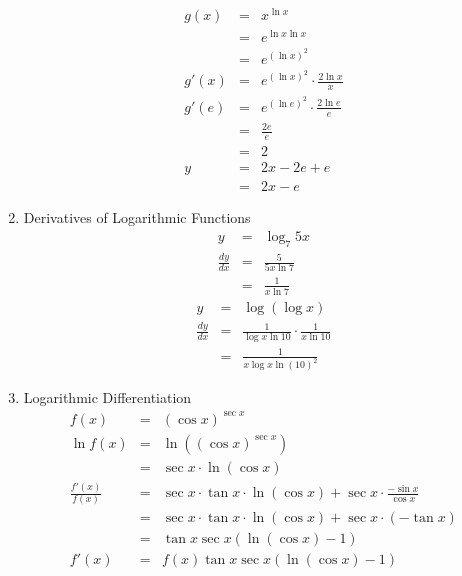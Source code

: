 \documentclass{article}
\begin{document}
\begin{enumerate}
    \begin{eqnarray}
        g(x) &=& x^{\ln{x}} \\
             &=& e^{\ln{x}\ln{x}} \\
             &=& e^{\left(\ln{x}\right)^2} \\
        g'(x) &=& e^{\left(\ln{x}\right)^2} \cdot \frac{2\ln{x}}{x} \\
        g'(e) &=& e^{\left(\ln{e}\right)^2} \cdot \frac{2\ln{e}}{e} \\
              &=& \frac{2e}{e} \\
              &=& 2 \\
        y &=& 2x - 2e + e \\
          &=& 2x - e
    \end{eqnarray}
    \item Derivatives of Logarithmic Functions
    \begin{eqnarray}
        y &=& \log_7{5x} \\
        \frac{dy}{dx} &=& \frac{5}{5x\ln{7}} \\
                      &=& \frac{1}{x\ln{7}}
    \end{eqnarray}
    \begin{eqnarray}
        y &=& \log{\left(\log{x}\right)} \\
        \frac{dy}{dx} &=& \frac{1}{\log{x}\ln{10}} \cdot \frac{1}{x\ln{10}} \\
                      &=& \frac{1}{x\log{x}\ln{\left(10\right)}^2}
    \end{eqnarray}
    \item Logarithmic Differentiation
    \begin{eqnarray}
        f(x) &=& \left(\cos{x}\right)^{\sec{x}} \\
        \ln{f(x)} &=& \ln{\left(\left(\cos{x}\right)^{\sec{x}}\right)} \\
                  &=& \sec{x} \cdot \ln{\left(\cos{x}\right)} \\
        \frac{f'(x)}{f(x)} &=& \sec{x} \cdot \tan{x} \cdot \ln{\left(\cos{x}\right)} + \sec{x} \cdot \frac{-\sin{x}}{\cos{x}} \\
                      &=& \sec{x} \cdot \tan{x} \cdot \ln{\left(\cos{x}\right)} + \sec{x} \cdot \left(-\tan{x}\right) \\
                      &=& \tan{x}\sec{x}\left(\ln{\left(\cos{x}\right)} - 1\right) \\
        f'(x) &=& f(x)\tan{x}\sec{x}\left(\ln{\left(\cos{x}\right)} - 1\right) \\

\end{eqnarray}
\end{enumerate}
\end{document}
